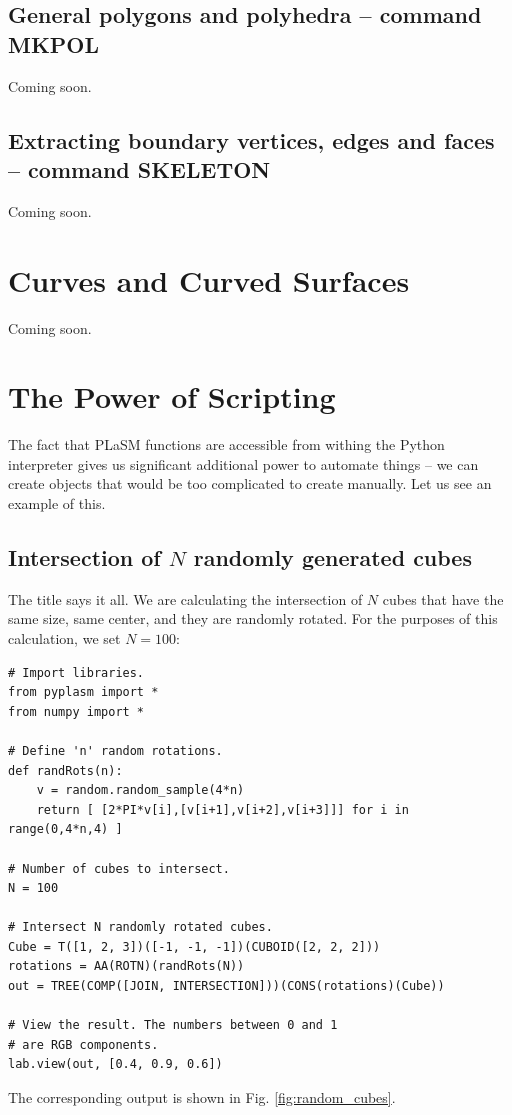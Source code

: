 \documentclass[article,A4,12pt]{llncs}
\begin{document}
\subsection{General polygons and polyhedra -- command MKPOL}

Coming soon.

\subsection{Extracting boundary vertices, edges and faces -- command SKELETON}

Coming soon.



\section{Curves and Curved Surfaces}

Coming soon.

\section{The Power of Scripting}

The fact that PLaSM functions are accessible from withing the Python 
interpreter gives us significant additional power to automate things 
-- we can create objects that would be too complicated to create manually. 
Let us see an example of this.

\subsection{Intersection of $N$ randomly generated cubes}

The title says it all. We are calculating the intersection of 
$N$ cubes that have the same size, same center, and they are 
randomly rotated. For the purposes of this calculation, we
set $N = 100$:

{\small
\begin{verbatim}
# Import libraries.
from pyplasm import *
from numpy import *

# Define 'n' random rotations.
def randRots(n):
    v = random.random_sample(4*n)
    return [ [2*PI*v[i],[v[i+1],v[i+2],v[i+3]]] for i in range(0,4*n,4) ]

# Number of cubes to intersect.
N = 100
  
# Intersect N randomly rotated cubes.
Cube = T([1, 2, 3])([-1, -1, -1])(CUBOID([2, 2, 2]))
rotations = AA(ROTN)(randRots(N))
out = TREE(COMP([JOIN, INTERSECTION]))(CONS(rotations)(Cube))

# View the result. The numbers between 0 and 1 
# are RGB components.
lab.view(out, [0.4, 0.9, 0.6])
\end{verbatim}
}
\noindent
The corresponding output is shown in Fig. \ref{fig:random_cubes}.
\end{document}
